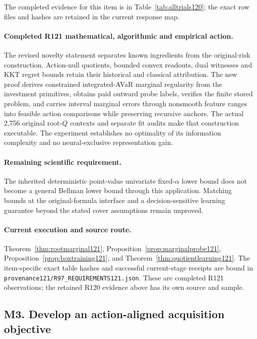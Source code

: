The completed evidence for this item is in Table~\ref{tab:alltrials120}; the exact row files and hashes are retained in the current response map.

\paragraph{Completed R121 mathematical, algorithmic and empirical action.}
The revised novelty statement separates known ingredients from the original-risk construction. Action-null quotients, bounded convex readouts, dual witnesses and KKT regret bounds retain their historical and classical attribution. The new proof derives constrained integrated-AVaR marginal regularity from the investment primitives, obtains paid outward probe labels, verifies the finite stored problem, and carries interval marginal errors through nonsmooth feature ranges into feasible action comparisons while preserving recursive anchors. The actual 2,756 original root-$Q$ contexts and separate fit audits make that construction executable. The experiment establishes no optimality of its information complexity and no neural-exclusive representation gain.

\paragraph{Remaining scientific requirement.}
The inherited deterministic point-value univariate fixed-$\alpha$ lower bound does not become a general Bellman lower bound through this application. Matching bounds at the original-formula interface and a decision-sensitive learning guarantee beyond the stated cover assumptions remain unproved.

\paragraph{Current execution and source route.}
Theorem~\ref{thm:rootmarginal121}, Proposition~\ref{prop:marginalprobe121}, Proposition~\ref{prop:boxtraining121}, and Theorem~\ref{thm:quotientlearning121}.
The item-specific exact table hashes and successful current-stage receipts are bound in \nolinkurl{provenance121/R97_REQUIREMENTS121.json}. These are completed R121 observations; the retained R120 evidence above has its own source and sample.

\subsection{M3. Develop an action-aligned acquisition objective}
\label{response121:M3}

